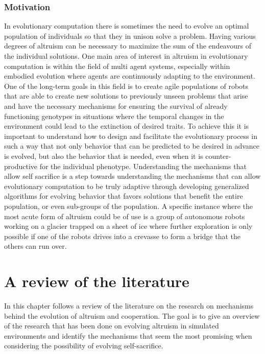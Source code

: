 \documentclass[a4paper]{book}
\begin{document}
\subsection{Motivation}
In evolutionary computation there is sometimes the need to evolve an optimal population of individuals so that they in unison solve a problem. 
Having various degrees of altruism can be necessary to maximize the sum of the endeavours of the individual solutions. 
One main area of interest in altruism in evolutionary computation is within the field of multi agent systems, especially within embodied evolution where agents are continuously adapting to the environment. One of the long-term goals in this field is to create agile populations of robots that are able to create new solutions to previously unseen problems that  arise and have the necessary mechanisms for ensuring the survival of already functioning genotypes in situations where the temporal changes in the environment could lead to the extinction of desired traits.  
To achieve this it is important to understand how to design and facilitate the evolutionary process in such a way that not only behavior that can be predicted to be desired in advance is evolved, but also the behavior that is needed, even when it is counter-productive for the individual phenotype.
Understanding the mechanisms that allow self sacrifice is a step towards understanding the mechanisms that can allow evolutionary computation to be truly adaptive through developing generalized algorithms for evolving behavior that favors solutions that benefit the entire population, or even sub-groups of the population.
A specific instance where the most acute form of altruism could be of use is a group of autonomous robots working on a  glacier trapped on a sheet of ice where further exploration is only possible if one of the robots drives into a crevasse to form a bridge that the others can run over.    
\chapter{A review of the literature}
\label{cha:review}

In this chapter follows a review of the literature on the research on mechanisms behind the evolution of altruism and cooperation.
The goal is to give  an overview of the research that has been done on evolving altruism in simulated environments and identify the mechanisms that seem the most promising when considering the possibility of evolving self-sacrifice.
\end{document}
